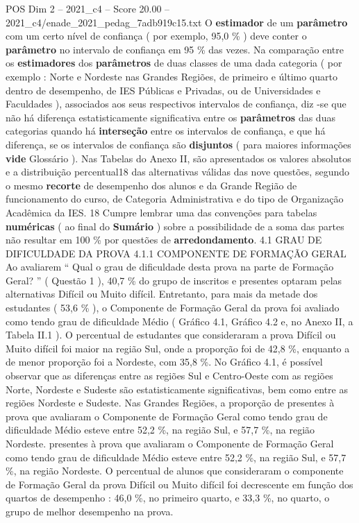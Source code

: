 \begin{textsample}{POS Dim 2 – 2021\_c4 – Score 20.00 – 2021\_c4/enade\_2021\_pedag\_7adb919c15.txt}
O \textbf{estimador} de um \textbf{parâmetro} com um certo nível de confiança ( por exemplo, 95,0 \% ) deve conter o \textbf{parâmetro} no intervalo de confiança em 95 \% das vezes.
Na comparação entre os \textbf{estimadores} dos \textbf{parâmetros} de duas classes de uma dada categoria ( por exemplo : Norte e Nordeste nas Grandes Regiões, de primeiro e último quarto dentro de desempenho, de IES Públicas e Privadas, ou de Universidades e Faculdades ), associados aos seus respectivos intervalos de confiança, diz -se que não há diferença estatisticamente significativa entre os \textbf{parâmetros} das duas categorias quando há \textbf{interseção} entre os intervalos de confiança, e que há diferença, se os intervalos de confiança são \textbf{disjuntos} ( para maiores informações \textbf{vide} Glossário ).
Nas Tabelas do Anexo II, são apresentados os valores absolutos e a distribuição percentual18 das alternativas válidas das nove questões, segundo o mesmo \textbf{recorte} de desempenho dos alunos e da Grande Região de funcionamento do curso, de Categoria Administrativa e do tipo de Organização Acadêmica da IES. 18 Cumpre lembrar uma das convenções para tabelas \textbf{numéricas} ( ao final do \textbf{Sumário} ) sobre a possibilidade de a soma das partes não resultar em 100 \% por questões de \textbf{arredondamento}. 4.1 GRAU DE DIFICULDADE DA PROVA 4.1.1 COMPONENTE DE FORMAÇÃO GERAL Ao avaliarem “ Qual o grau de dificuldade desta prova na parte de Formação Geral? ” ( Questão 1 ), 40,7 \% do grupo de inscritos e presentes optaram pelas alternativas Difícil ou Muito difícil.
Entretanto, para mais da metade dos estudantes ( 53,6 \% ), o Componente de Formação Geral da prova foi avaliado como tendo grau de dificuldade Médio ( Gráfico 4.1, Gráfico 4.2 e, no Anexo II, a Tabela II.1 ).
O percentual de estudantes que consideraram a prova Difícil ou Muito difícil foi maior na região Sul, onde a proporção foi de 42,8 \%, enquanto a de menor proporção foi a Nordeste, com 35,8 \%.
No Gráfico 4.1, é possível observar que as diferenças entre as regiões Sul e Centro-Oeste com as regiões Norte, Nordeste e Sudeste são estatisticamente significativas, bem como entre as regiões Nordeste e Sudeste.
Nas Grandes Regiões, a proporção de presentes à prova que avaliaram o Componente de Formação Geral como tendo grau de dificuldade Médio esteve entre 52,2 \%, na região Sul, e 57,7 \%, na região Nordeste. presentes à prova que avaliaram o Componente de Formação Geral como tendo grau de dificuldade Médio esteve entre 52,2 \%, na região Sul, e 57,7 \%, na região Nordeste.
O percentual de alunos que consideraram o componente de Formação Geral da prova Difícil ou Muito difícil foi decrescente em função dos quartos de desempenho : 46,0 \%, no primeiro quarto, e 33,3 \%, no quarto, o grupo de melhor desempenho na prova.

\end{textsample}
